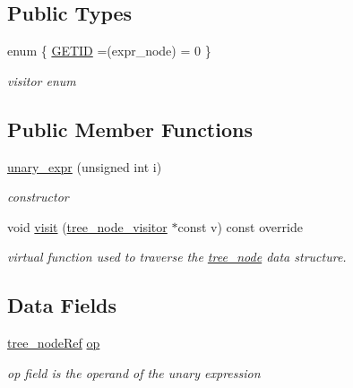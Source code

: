 \subsection*{Public Types}
\begin{DoxyCompactItemize}
\item 
enum \{ \hyperlink{structunary__expr_ab2b0179fe9274c67ce05531dd4db45acace6e39f05809bdcc6b4ddaf837c13f62}{G\+E\+T\+ID} =(expr\+\_\+node) = 0
 \}\begin{DoxyCompactList}\small\item\em visitor enum \end{DoxyCompactList}
\end{DoxyCompactItemize}
\subsection*{Public Member Functions}
\begin{DoxyCompactItemize}
\item 
\hyperlink{structunary__expr_a1d306a0ee4139f852cee58b546c60ae1}{unary\+\_\+expr} (unsigned int i)
\begin{DoxyCompactList}\small\item\em constructor \end{DoxyCompactList}\item 
void \hyperlink{structunary__expr_a0373bfbbec394ab8d9e88b5ff6d60890}{visit} (\hyperlink{classtree__node__visitor}{tree\+\_\+node\+\_\+visitor} $\ast$const v) const override
\begin{DoxyCompactList}\small\item\em virtual function used to traverse the \hyperlink{classtree__node}{tree\+\_\+node} data structure. \end{DoxyCompactList}\end{DoxyCompactItemize}
\subsection*{Data Fields}
\begin{DoxyCompactItemize}
\item 
\hyperlink{tree__node_8hpp_a6ee377554d1c4871ad66a337eaa67fd5}{tree\+\_\+node\+Ref} \hyperlink{structunary__expr_ac4faefe96634e5b9be37c23ab3ad74d1}{op}
\begin{DoxyCompactList}\small\item\em op field is the operand of the unary expression \end{DoxyCompactList}\end{DoxyCompactItemize}
